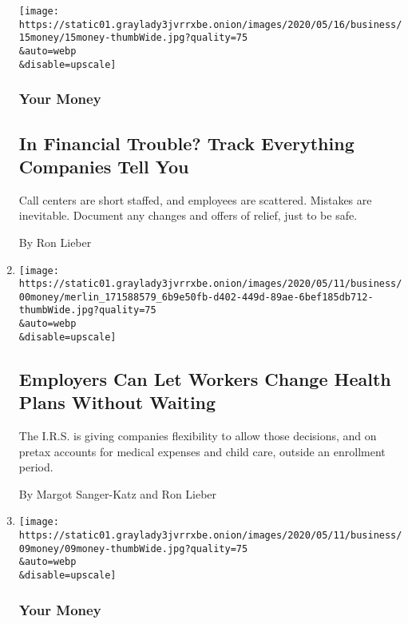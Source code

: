 \begin{enumerate}
  \texttt{[image: https://static01.graylady3jvrrxbe.onion/images/2020/05/16/business/15money/15money-thumbWide.jpg?quality=75\\\&auto=webp\\\&disable=upscale]}

  \hypertarget{your-money-4}{%
  \subsubsection{Your Money}\label{your-money-4}}

  \hypertarget{in-financial-trouble-track-everything-companies-tell-you}{%
  \subsection{In Financial Trouble? Track Everything Companies Tell
  You}\label{in-financial-trouble-track-everything-companies-tell-you}}

  Call centers are short staffed, and employees are scattered. Mistakes
  are inevitable. Document any changes and offers of relief, just to be
  safe.

  By Ron Lieber
\item
  \href{/2020/05/12/business/employer-health-plans-coronavirus.html}{}

  \texttt{[image: https://static01.graylady3jvrrxbe.onion/images/2020/05/11/business/00money/merlin\_171588579\_6b9e50fb-d402-449d-89ae-6bef185db712-thumbWide.jpg?quality=75\\\&auto=webp\\\&disable=upscale]}

  \hypertarget{employers-can-let-workers-change-health-plans-without-waiting}{%
  \subsection{Employers Can Let Workers Change Health Plans Without
  Waiting}\label{employers-can-let-workers-change-health-plans-without-waiting}}

  The I.R.S. is giving companies flexibility to allow those decisions,
  and on pretax accounts for medical expenses and child care, outside an
  enrollment period.

  By Margot Sanger-Katz and Ron Lieber
\item
  \href{/2020/05/09/your-money/dependent-care-account-coronavirus.html}{}

  \texttt{[image: https://static01.graylady3jvrrxbe.onion/images/2020/05/11/business/09money/09money-thumbWide.jpg?quality=75\\\&auto=webp\\\&disable=upscale]}

  \hypertarget{your-money-5}{%
  \subsubsection{Your Money}\label{your-money-5}}


\end{enumerate}
